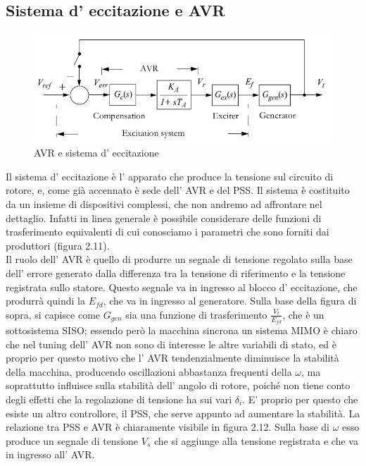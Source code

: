 \documentclass[Lau,noexaminfo]{sapthesis}
\begin{document}
	\subsection{Sistema d' eccitazione e AVR}
	\begin{figure}
		\centering
		\includegraphics[height=0.20\textheight]{AVR}
		\caption{AVR e sistema d' eccitazione}
	\end{figure}
	Il sistema d' eccitazione è l' apparato che produce la tensione sul circuito di rotore, e, come già accennato è sede dell' AVR e del PSS. Il sistema è costituito da un insieme di dispositivi complessi, che non andremo ad affrontare nel dettaglio. Infatti in linea generale è possibile considerare delle funzioni di trasferimento equivalenti di cui conosciamo i parametri che sono forniti dai produttori (figura 2.11).\\
	Il ruolo dell' AVR è quello di produrre un segnale di tensione regolato sulla base dell' errore generato dalla differenza tra la tensione di riferimento e la tensione registrata sullo statore. Questo segnale va in ingresso al blocco d' eccitazione, che produrrà quindi la $E_{fd}$, che va in ingresso al generatore. Sulla base della figura di sopra, si capisce come $G_{gen}$ sia una funzione di trasferimento $\frac{V_t}{E_{fd}}$, che è un sottosistema SISO; essendo però la macchina sincrona un sistema MIMO è chiaro che nel tuning dell' AVR non sono di interesse le altre variabili di stato, ed è proprio per questo motivo che l' AVR tendenzialmente diminuisce la stabilità della macchina, producendo oscillazioni abbastanza frequenti della $\omega$, ma soprattutto influisce sulla stabilità dell' angolo di rotore, poiché non tiene conto degli effetti che la regolazione di tensione ha sui vari $\delta_i$. E' proprio per questo che esiste un altro controllore, il PSS, che serve appunto ad aumentare la stabilità. La relazione tra PSS e AVR è chiaramente visibile in figura 2.12. Sulla base di $\omega$ esso produce un segnale di tensione $V_s$ che si aggiunge alla tensione registrata e che va in ingresso all' AVR.\\
\end{document}
